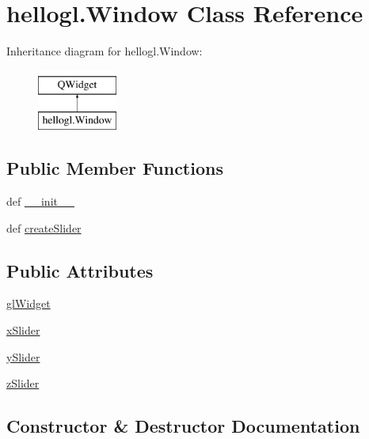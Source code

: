 \hypertarget{classhellogl_1_1Window}{}\section{hellogl.\+Window Class Reference}
\label{classhellogl_1_1Window}
Inheritance diagram for hellogl.\+Window\+:\begin{figure}[H]
\begin{center}
\leavevmode
\includegraphics[height=2.000000cm]{classhellogl_1_1Window}
\end{center}
\end{figure}
\subsection*{Public Member Functions}
\begin{DoxyCompactItemize}
\item 
def \hyperlink{classhellogl_1_1Window_a8e780dce014b2bb3f05e6bbc0af0d619}{\+\_\+\+\_\+init\+\_\+\+\_\+}
\item 
def \hyperlink{classhellogl_1_1Window_ac8558c580609b014db14a62edd766496}{create\+Slider}
\end{DoxyCompactItemize}
\subsection*{Public Attributes}
\begin{DoxyCompactItemize}
\item 
\hyperlink{classhellogl_1_1Window_a81049e905eebc0db786b6e93d2fac331}{gl\+Widget}
\item 
\hyperlink{classhellogl_1_1Window_af012dc7ec7dd866ad0db9f7ef550c568}{x\+Slider}
\item 
\hyperlink{classhellogl_1_1Window_af0236f84cd46f7ad37ccdf4ff2289af5}{y\+Slider}
\item 
\hyperlink{classhellogl_1_1Window_a9c33fe83e53f65022a7ff13c6c7f0bd4}{z\+Slider}
\end{DoxyCompactItemize}


\subsection{Constructor \& Destructor Documentation}
\hypertarget{classhellogl_1_1Window_a8e780dce014b2bb3f05e6bbc0af0d619}{}
